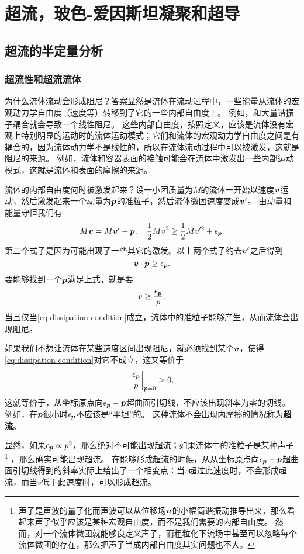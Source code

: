 \documentclass[hyperref, UTF8, a4paper]{ctexart}
\newcommand{\concept}[1]{\underline{\textbf{#1}}}
\begin{document}
\section{超流，玻色-爱因斯坦凝聚和超导}

\subsection{超流的半定量分析}

\subsubsection{超流性和超流流体}

为什么流体流动会形成阻尼？答案显然是流体在流动过程中，一些能量从流体的宏观动力学自由度（速度等）转移到了它的一些内部自由度上。
例如，和大量谐振子耦合就会导致一个线性阻尼。
这些内部自由度，按照定义，应该是流体没有宏观上特别明显的运动时的流体运动模式；它们和流体的宏观动力学自由度之间是有耦合的，因为流体动力学不是线性的，所以在流体流动过程中可以被激发，这就是阻尼的来源。
例如，流体和容器表面的接触可能会在流体中激发出一些内部运动模式，这就是流体和表面的摩擦的来源。

流体的内部自由度何时被激发起来？设一小团质量为$M$的流体一开始以速度$\vb*{v}$运动，然后激发起来一个动量为$\vb*{p}$的准粒子，然后流体微团速度变成$\vb*{v}'$。
由动量和能量守恒我们有
\[
    M \vb*{v} = M \vb*{v}' + \vb*{p}, \quad \frac{1}{2} M v^2 \geq \frac{1}{2} M v'^2 + \epsilon_{\vb*{p}}.
\]
第二个式子是因为可能出现了一些其它的激发。以上两个式子约去$\vb*{v}'$之后得到
\[
    \vb*{v} \cdot \vb*{p} \geq \epsilon_{\vb*{p}}.
\]
要能够找到一个$\vb*{p}$满足上式，就是要
\begin{equation}
    v \geq \frac{\epsilon_{\vb*{p}}}{p}.
    \label{eq:dissipation-condition}
\end{equation}
当且仅当\eqref{eq:dissipation-condition}成立，流体中的准粒子能够产生，从而流体会出现阻尼。

如果我们不想让流体在某些速度区间出现阻尼，就必须找到某个$\vb*{v}$，使得\eqref{eq:dissipation-condition}对它不成立，这又等价于
\[
    \eval{\frac{\epsilon_{\vb*{p}}}{p}}_{\vb*{p}=0} > 0,
\]
这就等价于，从坐标原点向$\epsilon_{\vb*{p}}-\vb*{p}$超曲面引切线，不应该出现斜率为零的切线。
例如，在$\vb*{p}$很小时$\epsilon_{\vb*{p}}$不应该是“平坦”的。
这种流体不会出现内摩擦的情况称为\concept{超流}。

显然，如果$\epsilon_{\vb*{p}} \propto p^2$，那么绝对不可能出现超流；如果流体中的准粒子是某种声子%
\footnote{声子是声波的量子化而声波可以从位移场$\vb*{u}$的小幅简谐振动推导出来，那么看起来声子似乎应该是某种宏观自由度，而不是我们需要的内部自由度。
然而，对一个流体微团就能够良定义声子，而粗粒化下流场中甚至可以忽略每个流体微团的存在，那么把声子当成内部自由度其实问题也不大。}%
，那么确实可能出现超流。
在能够形成超流的时候，从从坐标原点向$\epsilon_{\vb*{p}}-\vb*{p}$超曲面引切线得到的斜率实际上给出了一个相变点：当$v$超过此速度时，不会形成超流，而当$v$低于此速度时，可以形成超流。
\end{document}
